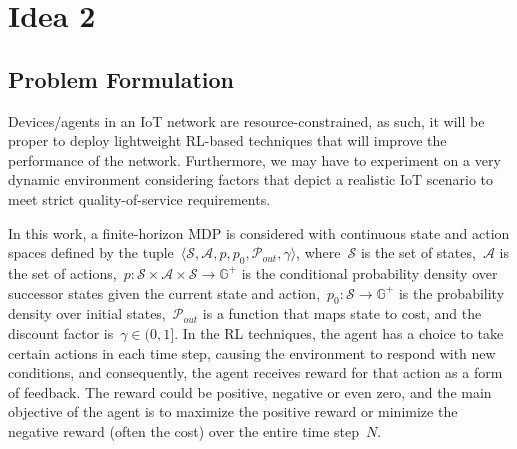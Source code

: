 \documentclass[journal]{IEEEtran}
\begin{document}
%
%
%
%
%


\section{Idea 2}
\label{sec:Idea2a}
\subsection{Problem Formulation}

Devices/agents in an IoT network are resource-constrained, as such, it will be proper to deploy lightweight RL-based techniques that will improve the performance of the network. Furthermore, we may have to experiment on a very dynamic environment considering factors that depict a realistic IoT scenario to meet strict quality-of-service requirements.

In this work, a finite-horizon MDP is considered with continuous state and action spaces defined by the tuple~$\langle \mathcal{S}, \mathcal{A}, p, p_0, \mathcal{P}_{out}, \gamma \rangle$, where~$\mathcal{S}$ is the set of states,~$\mathcal{A}$ is the set of actions,~$p: \mathcal{S}\times \mathcal{A} \times \mathcal{S} \rightarrow \mathbb{G}^+$ is the conditional probability density over successor states given the current state and action,~$p_0: \mathcal{S} \rightarrow \mathbb{G}^+ $ is the probability density over initial states,~$\mathcal{P}_{out}$ is a function that maps state to cost, and the discount factor is~$\gamma \in (0,1]$.
In the RL techniques, the agent has a choice to take certain actions in each time step, causing the environment to respond with new conditions, and consequently, the agent receives reward for that action as a form of feedback. The reward could be positive, negative or even zero, and the main objective of the agent is to maximize the positive reward or minimize the negative reward (often the cost) over the entire time step~$N$.
\end{document}
